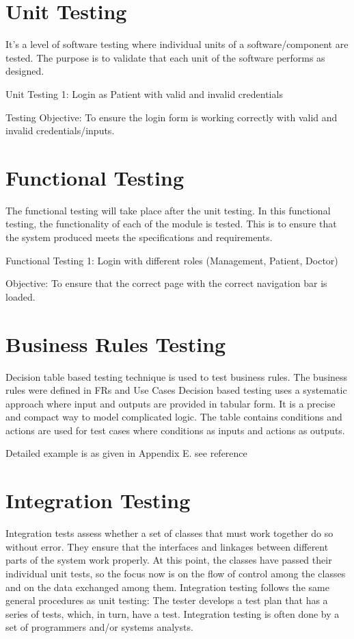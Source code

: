 \documentclass[A4paper,12pt]{report}
\theoremstyle{plain}
\theoremstyle{definition}
\theoremstyle{remark}
\numberwithin{equation}{section}
\begin{document}
\section{Unit Testing}

It’s a level of software testing where individual units of a software/component are tested. The purpose is to validate that each unit of the software performs as designed.

Unit Testing 1:   Login as Patient with valid and invalid credentials

Testing Objective: To ensure the login form is working correctly with valid and invalid credentials/inputs.

\section{Functional Testing}
The functional testing will take place after the unit testing. In this functional testing, the functionality of each of the module is tested. This is to ensure that the system produced meets the specifications and requirements.

Functional Testing 1: Login with different roles (Management, Patient, Doctor) 

Objective: To ensure that the correct page with the correct navigation bar is loaded.  

\section{Business Rules Testing}
Decision table based testing technique is used to test business rules. The business rules were defined in FRs and Use Cases
Decision based testing uses a systematic approach where input and outputs are provided in tabular form. It is a precise and compact way to model complicated logic. The table contains conditions and actions are used for test cases where conditions as inputs and actions as outputs.

Detailed example is as given in Appendix E. see reference \cite{Abuleil2023}

\section{Integration Testing}
Integration tests assess whether a set of classes that must work together do so without error. They
ensure that the interfaces and linkages between different parts of the system work properly. At this point, the classes have passed their individual unit tests, so the focus now is on the flow of control among the classes and on the data exchanged among them. Integration testing follows the same general procedures as unit testing: The tester develops a test plan that has a series of tests, which, in turn, have a test. Integration testing is often done by a set of programmers and/or systems analysts.
\end{document}
